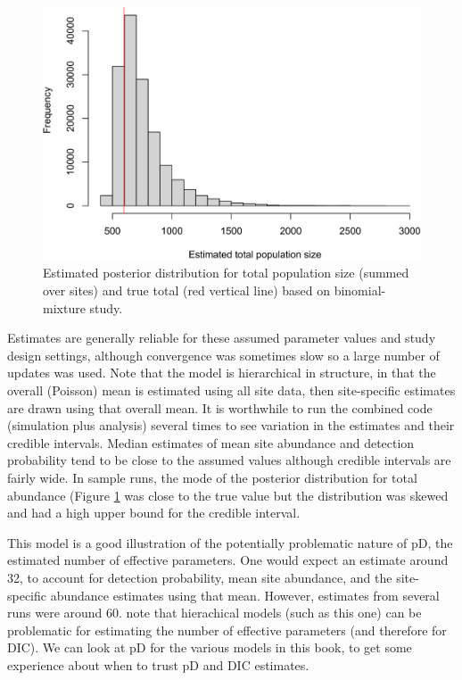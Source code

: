 \documentclass[
]{krantz}
\begin{document}
\begin{figure}
\includegraphics[width=0.9\linewidth]{bookdown_files/figure-latex/NmixPlot-1} \caption{Estimated posterior distribution for total population size (summed over sites) and true total (red vertical line) based on binomial-mixture study.}\label{fig:NmixPlot}
\end{figure}

Estimates are generally reliable for these assumed parameter values and study design settings, although convergence was sometimes slow so a large number of updates was used. Note that the model is hierarchical in structure, in that the overall (Poisson) mean is estimated using all site data, then site-specific estimates are drawn using that overall mean. It is worthwhile to run the combined code (simulation plus analysis) several times to see variation in the estimates and their credible intervals. Median estimates of mean site abundance and detection probability tend to be close to the assumed values although credible intervals are fairly wide. In sample runs, the mode of the posterior distribution for total abundance (Figure \ref{fig:NmixPlot} was close to the true value but the distribution was skewed and had a high upper bound for the credible interval.

This model is a good illustration of the potentially problematic nature of pD, the estimated number of effective parameters. One would expect an estimate around 32, to account for detection probability, mean site abundance, and the site-specific abundance estimates using that mean. However, estimates from several runs were around 60. \citet{kéry.schaub_2011} note that hierachical models (such as this one) can be problematic for estimating the number of effective parameters (and therefore for DIC). We can look at pD for the various models in this book, to get some experience about when to trust pD and DIC estimates.
\end{document}
